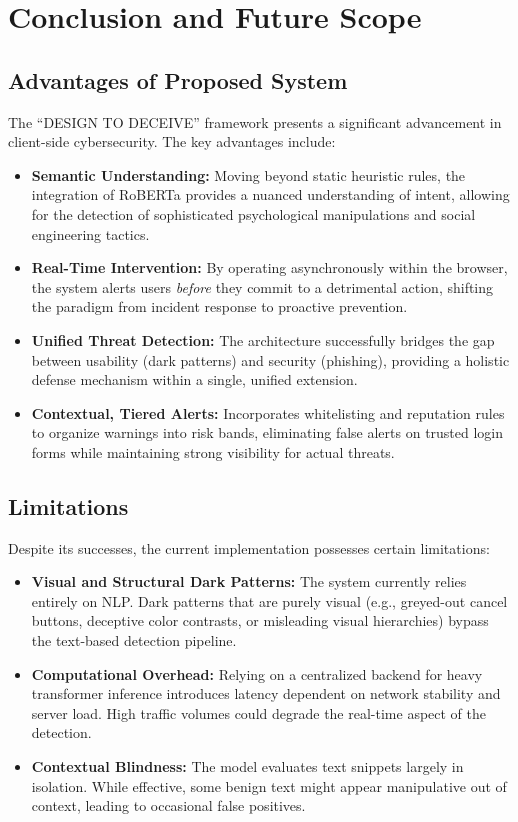 
\chapter{Conclusion and Future Scope}

\section{Advantages of Proposed System}
The ``DESIGN TO DECEIVE'' framework presents a significant advancement in client-side cybersecurity. The key advantages include:
\begin{itemize}
    \item \textbf{Semantic Understanding:} Moving beyond static heuristic rules, the integration of RoBERTa provides a nuanced understanding of intent, allowing for the detection of sophisticated psychological manipulations and social engineering tactics.
    \item \textbf{Real-Time Intervention:} By operating asynchronously within the browser, the system alerts users \textit{before} they commit to a detrimental action, shifting the paradigm from incident response to proactive prevention.
    \item \textbf{Unified Threat Detection:} The architecture successfully bridges the gap between usability (dark patterns) and security (phishing), providing a holistic defense mechanism within a single, unified extension.
    \item \textbf{Contextual, Tiered Alerts:} Incorporates whitelisting and reputation rules to organize warnings into risk bands, eliminating false alerts on trusted login forms while maintaining strong visibility for actual threats.
\end{itemize}

\section{Limitations}
Despite its successes, the current implementation possesses certain limitations:
\begin{itemize}
    \item \textbf{Visual and Structural Dark Patterns:} The system currently relies entirely on NLP. Dark patterns that are purely visual (e.g., greyed-out cancel buttons, deceptive color contrasts, or misleading visual hierarchies) bypass the text-based detection pipeline.
    \item \textbf{Computational Overhead:} Relying on a centralized backend for heavy transformer inference introduces latency dependent on network stability and server load. High traffic volumes could degrade the real-time aspect of the detection.
    \item \textbf{Contextual Blindness:} The model evaluates text snippets largely in isolation. While effective, some benign text might appear manipulative out of context, leading to occasional false positives.
\end{itemize}


